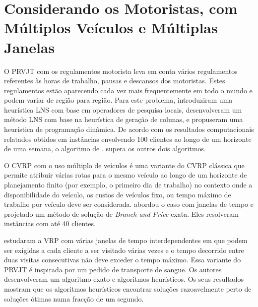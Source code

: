 \section{Considerando os Motoristas, com Múltiplos Veículos e Múltiplas Janelas}

O PRVJT com os regulamentos motorista leva em conta vários regulamentos referentes às horas de trabalho, pausas e descansos dos motoristas. Estes regulamentos estão aparecendo cada vez mais frequentemente em todo o mundo e podem variar de região para região. Para este problema, \cite{goel08} introduziram uma heurística LNS com base em operadores de pesquisa locais, \cite{prescott09} desenvolveram um método LNS com base na heurística de geração de colunas, e \cite{kok10} propuseram uma heurística de programação dinâmica. De acordo com os resultados computacionais relatados obtidos em instâncias envolvendo 100 clientes ao longo de um horizonte de uma semana, o algoritmo de \cite{prescott09}. supera os outros dois algoritmos.

O CVRP com o uso múltiplo de veículos é uma variante do CVRP clássica que permite atribuir várias rotas para o mesmo veículo ao longo de um horizonte de planejamento finito (por exemplo, o primeiro dia de trabalho) no contexto onde a disponibilidade do veículo, os custos de veículos fixo, ou tempo máximo de trabalho por veículo deve ser considerada. \cite{azi12} abordou o caso com janelas de tempo e projetado um método de solução de \textit{Branch-and-Price} exata. Eles resolveram instâncias com até 40 clientes.

\cite{doerner10} estudaram a VRP com várias janelas de tempo interdependentes em que podem ser exigidas a cada cliente a ser visitado várias vezes e o tempo decorrido entre duas visitas consecutivas não deve exceder o tempo máximo. Essa variante do PRVJT é inspirada por um pedido de transporte de sangue. Os autores desenvolveram um algoritmo exato e algoritmos heurísticos. Os seus resultados mostram que os algoritmos heurísticos encontrar soluções razoavelmente perto de soluções ótimas numa fracção de um segundo.

